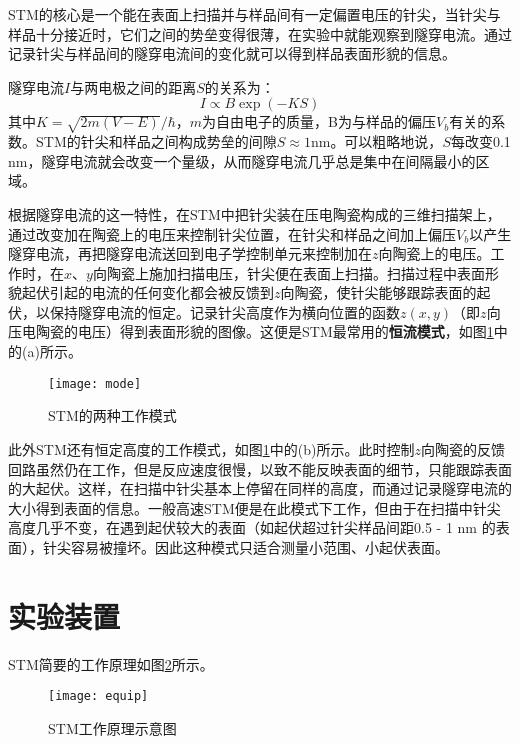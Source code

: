 \documentclass[aps,pre,12pt,preprint,onecolumn,showpacs,showkeys]{revtex4-1}
\begin{document}

STM的核心是一个能在表面上扫描并与样品间有一定偏置电压的针尖，当针尖与样品十分接近时，它们之间的势垒变得很薄，在实验中就能观察到隧穿电流。通过记录针尖与样品间的隧穿电流间的变化就可以得到样品表面形貌的信息。

隧穿电流$I$与两电极之间的距离$S$的关系为：
\begin{equation}
I\propto B\exp(-KS)
\end{equation}
其中$K=\sqrt{2m(V-E)}/\hbar$，$m$为自由电子的质量，B为与样品的偏压$V_b$有关的系数。STM的针尖和样品之间构成势垒的间隙$S\approx 1 \mathrm{nm}$。可以粗略地说，$S$每改变0.1 nm，隧穿电流就会改变一个量级，从而隧穿电流几乎总是集中在间隔最小的区域。

根据隧穿电流的这一特性，在STM中把针尖装在压电陶瓷构成的三维扫描架上，通过改变加在陶瓷上的电压来控制针尖位置，在针尖和样品之间加上偏压$V_b$以产生隧穿电流，再把隧穿电流送回到电子学控制单元来控制加在$z$向陶瓷上的电压。工作时，在$x$、$y$向陶瓷上施加扫描电压，针尖便在表面上扫描。扫描过程中表面形貌起伏引起的电流的任何变化都会被反馈到$z$向陶瓷，使针尖能够跟踪表面的起伏，以保持隧穿电流的恒定。记录针尖高度作为横向位置的函数$z(x,y)$（即$z$向压电陶瓷的电压）得到表面形貌的图像。这便是STM最常用的\textbf{恒流模式}，如图\ref{fig:mode}中的(a)所示。
\begin{figure}[h]
\centering
\texttt{[image: mode]}
\caption{\label{fig:mode}%
STM的两种工作模式}
\end{figure}

此外STM还有恒定高度的工作模式，如图\ref{fig:mode}中的(b)所示。此时控制$z$向陶瓷的反馈回路虽然仍在工作，但是反应速度很慢，以致不能反映表面的细节，只能跟踪表面的大起伏。这样，在扫描中针尖基本上停留在同样的高度，而通过记录隧穿电流的大小得到表面的信息。一般高速STM便是在此模式下工作，但由于在扫描中针尖高度几乎不变，在遇到起伏较大的表面（如起伏超过针尖样品间距0.5 - 1 nm 的表面），针尖容易被撞坏。因此这种模式只适合测量小范围、小起伏表面。

\section{实验装置}
STM简要的工作原理如图\ref{fig:equip}所示。
\begin{figure}[h]
\centering
\texttt{[image: equip]}
\caption{\label{fig:equip}%
STM工作原理示意图}
\end{figure}
\end{document}
